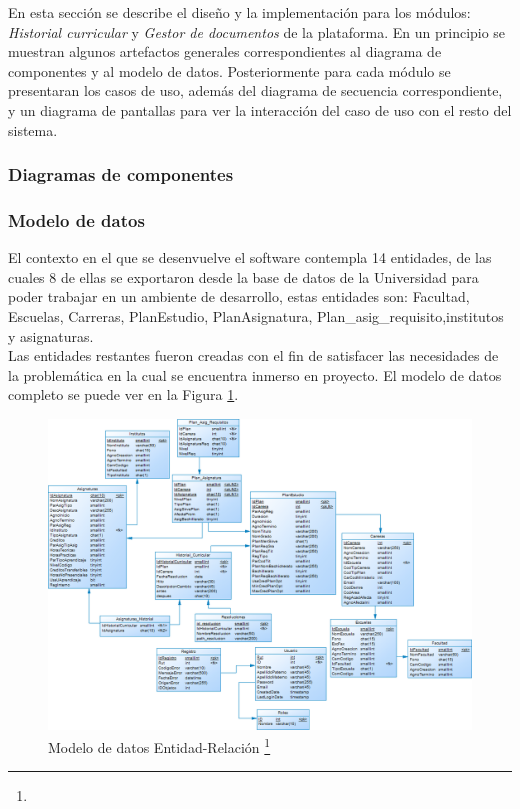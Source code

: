 	En esta sección se describe el diseño y la implementación para los módulos: \textit{Historial curricular} y \textit{Gestor de documentos} de la plataforma. En un principio se muestran algunos artefactos generales correspondientes al diagrama de componentes y al modelo de datos. Posteriormente para cada módulo se presentaran los casos de uso, además del diagrama de secuencia correspondiente, y un diagrama de pantallas para ver la interacción del caso de uso con el resto del sistema.


	\subsubsection{Diagramas de componentes}
	\subsubsection{Modelo de datos}
	
	El contexto en el que se desenvuelve el software contempla 14 entidades, de las cuales 8 de ellas se exportaron desde la base de datos de la Universidad para poder trabajar en un ambiente de desarrollo, estas entidades son: Facultad, Escuelas, Carreras, PlanEstudio, PlanAsignatura, Plan\_asig\_requisito,institutos y asignaturas.
	\\
	
	Las entidades restantes fueron creadas con el fin de satisfacer las necesidades de la problemática en la cual se encuentra inmerso en proyecto. El modelo de datos completo se puede ver en la Figura \ref{Modelo_E_R}.
	\\
	
	\begin{figure}[H]
		\centering
		\includegraphics[width=1\textwidth]{images/Capitulo_3/Modelo_E_R.png}
		\caption[Modelo de datos Entidad-Relación]{Modelo de datos Entidad-Relación \footnote{}}
		\label{Modelo_E_R}
	\end{figure}
